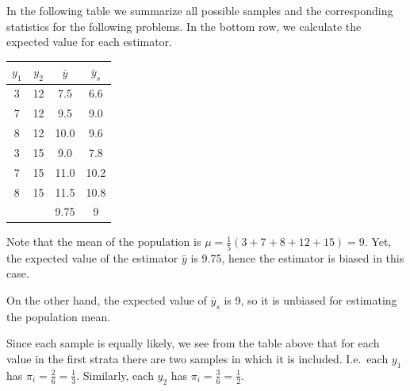 \documentclass{homework}
\begin{document}
In the following table we summarize all possible samples and the corresponding statistics for the following problems. In the bottom row, we calculate the expected value for each estimator.
\begin{center}
\begin{tabular}{|c c|c|c|}
$y_1$ & $y_2$ & $\bar y$ & $\bar y_s$ \\ \hline
3     & 12    &   7.5    &      6.6    \\
7     & 12    &   9.5    &      9.0    \\
8     & 12    &  10.0    &      9.6    \\
3     & 15    &   9.0    &      7.8    \\
7     & 15    &  11.0    &     10.2    \\
8     & 15    &  11.5    &     10.8    \\\hline
      &	      &  9.75	 &     9       \\
\end{tabular}
\end{center}

\begin{solution}
  Note that the mean of the population is $\mu=\frac 15(3+7+ 8+12+15) = 9$. Yet, the expected value of the estimator $\bar y$ is 9.75, hence the estimator is biased in this case.
\end{solution}

\begin{solution}
  On the other hand, the expected value of $\bar y_s$ is 9, so it is unbiased for estimating the population mean.
\end{solution}

\begin{solution}
Since each sample is equally likely, we see from the table above that for each value in the first strata there are two samples in which it is included. I.e.~each $y_1$ has $\pi_i = \frac 26 = \frac 13$.  Similarly, each $y_2$ has $\pi_i = \frac 36 = \frac 12$.
\end{solution}
\end{document}
